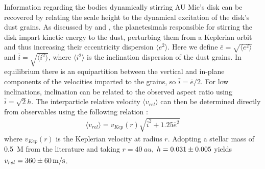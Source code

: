 \documentclass[modern]{aastex62}
\begin{document}
Information regarding the bodies dynamically stirring AU Mic's disk can be recovered by relating the scale height to the dynamical excitation of the disk's dust grains.
As discussed by \cite{thebault09} and \cite{quillen07}, the planetesimals responsible for stirring the disk impart kinetic energy to the dust, perturbing them from a Keplerian orbit and thus increasing their eccentricity dispersion $\langle e^2 \rangle$. 
Here we define $\bar{e} = \sqrt{\langle e^2 \rangle}$ and $\bar{i} = \sqrt{\langle i^2 \rangle}$, where $\langle i^2 \rangle$ is the inclination dispersion of the dust grains.
In equilibrium there is an equipartition between the vertical and in-plane components of the velocities imparted to the grains, so $\bar{i} = {\bar{e}}/{2}$.
For low inclinations, inclination can be related to the observed aspect ratio using $\bar{i} = \sqrt{2}h$.
The interparticle relative velocity $\langle v_{rel} \rangle$ can then be determined directly from observables using the following relation \citep{wetherill&stewart93,wyatt&dent02}:
\begin{gather}
  \langle v_{rel} \rangle = v_{Kep}(r) \sqrt{\bar{i}^2 + 1.25 \bar{e}^2}
\end{gather}
where $v_{Kep}(r)$ is the Keplerian velocity at radius $r$. 
Adopting a stellar mass of \SI{0.5}{M_\sun} from the literature \citep{plavchan09,houdebine&doyle94} and taking $r = \SI{40}{au}$, $h=\num{0.031 \pm 0.005}$ yields $v_{rel} = \SI{360 \pm 60}{m/s}$.
\end{document}
